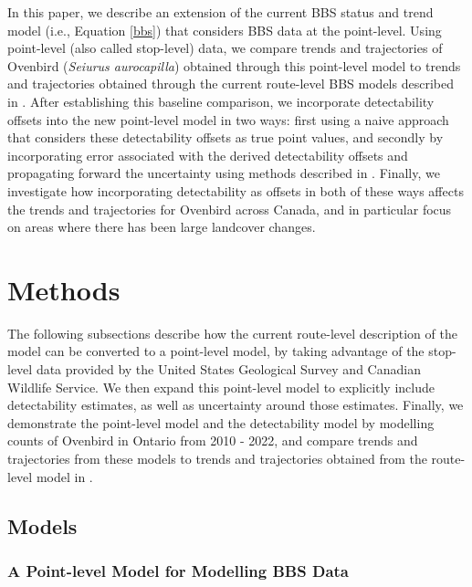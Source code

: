 \documentclass[12pt]{article}
\begin{document}
\par In this paper, we describe an extension of the current BBS status and trend model (i.e., Equation \ref{bbs}) that considers BBS data at the point-level. 
Using point-level (also called stop-level) data, we compare trends and trajectories of Ovenbird (\textit{Seiurus aurocapilla}) obtained through this point-level model to trends and trajectories obtained through the current route-level BBS models described in \citet{smith_spatially_2023}.
After establishing this baseline comparison, we incorporate detectability offsets into the new point-level model in two ways: first using a naive approach that considers these detectability offsets as true point values, and secondly by incorporating error associated with the derived detectability offsets and propagating forward the uncertainty using methods described in \citet{bravington_variance_2021}.
Finally, we investigate how incorporating detectability as offsets in both of these ways affects the trends and trajectories for Ovenbird across Canada, and in particular focus on areas where there has been large landcover changes.

\section{Methods}

\par The following subsections describe how the current route-level description of the model can be converted to a point-level model, by taking advantage of the stop-level data provided by the United States Geological Survey and Canadian Wildlife Service. 
We then expand this point-level model to explicitly include detectability estimates, as well as uncertainty around those estimates. 
Finally, we demonstrate the point-level model and the detectability model by modelling counts of Ovenbird in Ontario from 2010 - 2022, and compare trends and trajectories from these models to trends and trajectories obtained from the route-level model in \citet{smith_spatially_2023}.

\subsection{Models}

\subsubsection{A Point-level Model for Modelling BBS Data}
\end{document}

